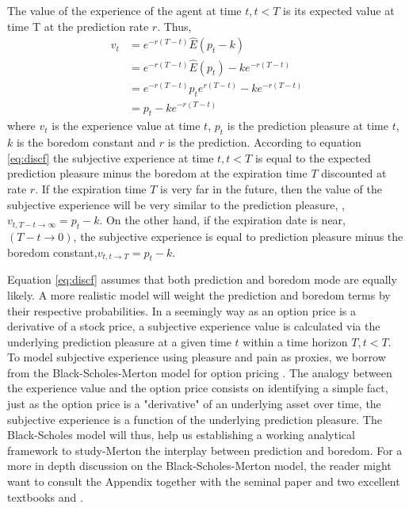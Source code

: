 \documentclass[11pt, onecolumn]{article}
\begin{document}
The value of the experience of the agent at time $t, t < T$ is its expected value at time T at the prediction rate $r$. Thus,
\begin{equation}
\begin{split}
    v_t  & =  e^{-r(T-t)}\hat{E}(p_{t} - k)  \\
       & = e^{-r(T-t)}\hat{E}(p_{t}) - k e^{-r(T-t)} \\
       & = e^{-r(T-t)}p_{t} e^{r(T-t)}  - k e^{-r(T-t)} \\ 
        & = p_{t}  - k e^{-r(T-t)} 
\end{split}
\label{eq:discf}
\end{equation}
where $v_t$ is the experience value at time $t$, $p_{t}$ is the prediction pleasure at time $t$, $k$ is the boredom constant and $r$ is the prediction.   
According to equation \ref{eq:discf} the subjective experience at time $t, t < T$ is equal to the expected prediction pleasure minus the boredom at the expiration time $T$ discounted at rate $r$. 
If the expiration time $T$ is very far in the future, then the value of the subjective experience will be very similar to the prediction pleasure, ,$ v_{t,T -t \to \infty} =  p_{t} - k$. On the other hand, if the expiration date is near, $(T-t \to 0)$, the subjective experience is equal to prediction pleasure minus the boredom constant,$ v_{t,t \to T} =  p_{t} - k $. 

Equation \ref{eq:discf} assumes that both prediction and boredom mode are equally likely. A more realistic model will weight the prediction and boredom terms by their respective probabilities. In a seemingly way as an option price is a derivative of a stock price, a subjective experience value is calculated via the underlying prediction pleasure at a given time $t$ within a time horizon $T, t < T$. To model subjective experience using pleasure and pain as proxies, we borrow from the Black-Scholes-Merton model for option pricing  \citep{black_pricing_1973}. The analogy between the experience value and the option price consists on identifying a simple fact, just as the option price is a "derivative" of an underlying asset over time, the subjective experience is a function of the underlying prediction pleasure. 
The Black-Scholes model will thus, help us establishing a working analytical framework to study-Merton the interplay between prediction and boredom. For a more in depth discussion on the Black-Scholes-Merton model, the reader might want to consult the Appendix together with the seminal paper \citep{black_pricing_1973} and two excellent textbooks \citep{hull_options_2005} and \citep{duffie_dynamic_2001}.
\end{document}
